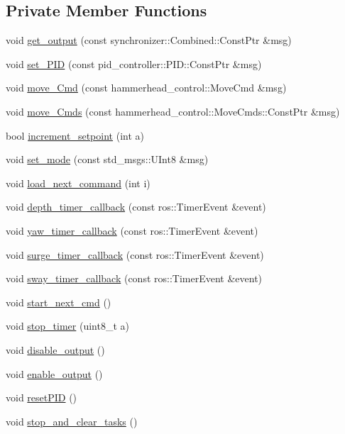 \subsection*{Private Member Functions}
\begin{DoxyCompactItemize}
\item 
void \hyperlink{classControl_a2256e97ad7be3e6f6904824bc35431a1}{get\+\_\+output} (const synchronizer\+::\+Combined\+::\+Const\+Ptr \&msg)
\item 
void \hyperlink{classControl_a45bba7b17f6c425ad51339e9797d6440}{set\+\_\+\+P\+ID} (const pid\+\_\+controller\+::\+P\+I\+D\+::\+Const\+Ptr \&msg)
\item 
void \hyperlink{classControl_a9b60da70983c874ff9cf2663950dee08}{move\+\_\+\+Cmd} (const hammerhead\+\_\+control\+::\+Move\+Cmd \&msg)
\item 
void \hyperlink{classControl_a7e8067da35d2bdef012d1e2b5533ac35}{move\+\_\+\+Cmds} (const hammerhead\+\_\+control\+::\+Move\+Cmds\+::\+Const\+Ptr \&msg)
\item 
bool \hyperlink{classControl_a6ee8f4ba7ab102861a2d2c3eeeb96201}{increment\+\_\+setpoint} (int a)
\item 
void \hyperlink{classControl_ae6fc47fc2c8a47346e558e4b831cc40f}{set\+\_\+mode} (const std\+\_\+msgs\+::\+U\+Int8 \&msg)
\item 
void \hyperlink{classControl_a8feeefb41dd3d3e460b2719444a6a309}{load\+\_\+next\+\_\+command} (int i)
\item 
void \hyperlink{classControl_a7220c85e82072fc36ce786e16ff04e51}{depth\+\_\+timer\+\_\+callback} (const ros\+::\+Timer\+Event \&event)
\item 
void \hyperlink{classControl_a2a3be58334e32c711f454545c18ee309}{yaw\+\_\+timer\+\_\+callback} (const ros\+::\+Timer\+Event \&event)
\item 
void \hyperlink{classControl_aac079e9acf0dfcb3a587410ca13360f8}{surge\+\_\+timer\+\_\+callback} (const ros\+::\+Timer\+Event \&event)
\item 
void \hyperlink{classControl_a8e578602a9fec51a4d86b4e0cb89653f}{sway\+\_\+timer\+\_\+callback} (const ros\+::\+Timer\+Event \&event)
\item 
void \hyperlink{classControl_a7618be791732b449b3bcc25c2397b7d2}{start\+\_\+next\+\_\+cmd} ()
\item 
void \hyperlink{classControl_ac1f9d1bd071865ab7b189ae2885b1e26}{stop\+\_\+timer} (uint8\+\_\+t a)
\item 
void \hyperlink{classControl_a2a6668b67b265687badf674e56416bef}{disable\+\_\+output} ()
\item 
void \hyperlink{classControl_ad2fd9593f94a996e015097d781a440c3}{enable\+\_\+output} ()
\item 
void \hyperlink{classControl_acbefd0ff411f2ac506880cb77dcb7c50}{reset\+P\+ID} ()
\item 
void \hyperlink{classControl_affda1a8c2f9cebb0ceef8c9970258dd2}{stop\+\_\+and\+\_\+clear\+\_\+tasks} ()
\end{DoxyCompactItemize}
